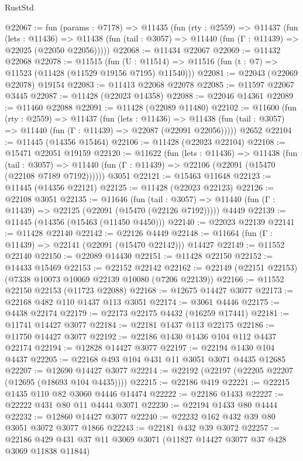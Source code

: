 \begin{lexlean}{RustStd}
\begin{coremodule}
@22067 := fun (params : @7178) =>
  @11435
    (fun (rty : @2559) =>
    @11437
      (fun (lets : @11436) =>
      @11438 (fun (tail : @3057) => @11440 (fun (Γ : @11439) => @22025 (@22050 @22056)))))
@22068 := @11434 @22067
@22069 := @11432 @22068
@22078 := @11515
    (fun (U : @11514) => @11516 (fun (t : @7) => @11523 (@11428 (@11529 @19156 @7195) @11540)))
@22081 := @22043 (@22069 @22078) @19154
@22083 := @11413 @22068 @22078
@22085 := @11597 @22067 @3445
@22087 := @11428 (@22023 @14358)
@22088 := @22046 @14361
@22089 := @11460 @22088
@22091 := @11428 (@22089 @11480)
@22102 := @11600
    (fun (rty : @2559) =>
    @11437
      (fun (lets : @11436) =>
      @11438 (fun (tail : @3057) => @11440 (fun (Γ : @11439) => @22087 (@22091 @22056)))))
    @2652
@22104 := @11445 (@14356 @15464)
@22106 := @11428 (@22023 @22104)
@22108 := @15471 @22051 @19159
@22120 := @11622
    (fun (lets : @11436) =>
    @11438
      (fun (tail : @3057) =>
      @11440 (fun (Γ : @11439) => @22106 (@22091 (@15470 (@22108 @7189 @7192))))))
    @3051
@22121 := @15463 @11648
@22123 := @11445 (@14356 @22121)
@22125 := @11428 (@22023 @22123)
@22126 := @22108 @3051
@22135 := @11646
    (fun (tail : @3057) => @11440 (fun (Γ : @11439) => @22125 (@22091 (@15470 (@22126 @7192)))))
    @4449
@22139 := @11445 (@14356 (@15463 (@11450 @4450)))
@22140 := @22023 @22139
@22141 := @11428 @22140
@22142 := @22126 @4449
@22148 := @11664 (fun (Γ : @11439) => @22141 (@22091 (@15470 @22142))) @14427
@22149 := @11552 @22140
@22150 := @22089 @14430
@22151 := @11428 @22150
@22152 := @14433 @15469
@22153 := @22152 @22142
@22162 := @22149 (@22151 @22153) (@7338 @10073 @10069 @22139 @10080 (@7206 @22139))
@22166 := @11552 @22150 @22153 (@11723 @22088)
@22168 := @12675 @14427 @3077
@22173 := @22168 @482 @110 @1437 @113 @3051
@22174 := @3061 @4446
@22175 := @4438 @22174
@22179 := @22173 @22175 @4432 (@16259 @17441)
@22181 := @11741 @14427 @3077
@22184 := @22181 @1437 @113 @22175
@22186 := @11750 @14427 @3077
@22192 := @22186 @1430 @1436 @104 @112 @4437 @22174
@22194 := @12828 @14427 @3077
@22197 := @22194 @1430 @104 @4437
@22205 := @22168 @493 @104 @431 @11 @3051 @3071 @4435 @12685
@22207 := @12690 @14427 @3077
@22214 := @22192 (@22197 (@22205 @22207 (@12695 (@18693 @104 @4435))))
@22215 := @22186 @419
@22221 := @22215 @1435 @110 @82 @3060 @4446 @14474
@22222 := @22186 @1433
@22227 := @22222 @431 @80 @11 @4444 @3071
@22230 := @22194 @1433 @80 @4444
@22232 := @12860 @14427 @3077
@22240 := @22232 @162 @432 @39 @80 @3051 @3072 @3077 @1866
@22243 := @22181 @432 @39 @3072
@22257 := @22186 @429 @431 @37 @11 @3069 @3071 (@11827 @14427 @3077 @37 @428 @3069 @11838 @11844)

\end{coremodule}
\end{lexlean}
